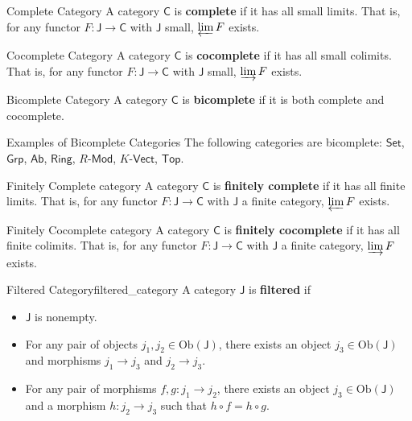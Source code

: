 \begin{definition}{Complete Category}{}
    A category $\mathsf{C}$ is \textbf{complete} if it has all small limits. That is, for any functor $F:\mathsf{J}\to \mathsf{C}$ with $\mathsf{J}$ small, $\varprojlim F$ exists.
\end{definition}

\begin{definition}{Cocomplete Category}{}
    A category $\mathsf{C}$ is \textbf{cocomplete} if it has all small colimits. That is, for any functor $F:\mathsf{J}\to \mathsf{C}$ with $\mathsf{J}$ small, $\varinjlim F$ exists.
\end{definition}

\begin{definition}{Bicomplete Category}{}
    A category $\mathsf{C}$ is \textbf{bicomplete} if it is both complete and cocomplete.
\end{definition}

\begin{example}{Examples of Bicomplete Categories}{}
    The following categories are bicomplete: $\mathsf{Set}$, $\mathsf{Grp}$, $\mathsf{Ab}$, $\mathsf{Ring}$, 
    $R\text{-}\mathsf{Mod}$, $K\text{-}\mathsf{Vect}$, $\mathsf{Top}$.
\end{example}

\begin{definition}{Finitely Complete category}{}
    A category $\mathsf{C}$ is \textbf{finitely complete} if it has all finite limits. That is, for any functor $F:\mathsf{J}\to \mathsf{C}$ with $\mathsf{J}$ a finite category, $\varprojlim F$ exists.
\end{definition}

\begin{definition}{Finitely Cocomplete category}{}
    A category $\mathsf{C}$ is \textbf{finitely cocomplete} if it has all finite colimits. That is, for any functor $F:\mathsf{J}\to \mathsf{C}$ with $\mathsf{J}$ a finite category, $\varinjlim F$ exists.
\end{definition}



\begin{definition}{Filtered Category}{filtered_category}
    A category $\mathsf{J}$ is \textbf{filtered} if 
    \begin{itemize}
        \item $\mathsf{J}$ is nonempty.
        \item For any pair of objects $j_1,j_2\in \mathrm{Ob}(\mathsf{J})$, there exists an object $j_3\in \mathrm{Ob}(\mathsf{J})$ and morphisms $j_1\to j_3$ and $j_2\to j_3$.
        \item For any pair of morphisms $f,g:j_1\to j_2$, there exists an object $j_3\in \mathrm{Ob}(\mathsf{J})$ and a morphism $h:j_2\to j_3$ such that $h\circ f=h\circ g$.
    \end{itemize}
\end{definition}


